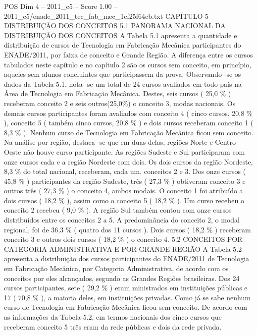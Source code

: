 \begin{textsample}{POS Dim 4 – 2011\_c5 – Score 1.00 – 2011\_c5/enade\_2011\_tec\_fab\_mec\_1cf25f64cb.txt}  \label{ex:f4_pos_240}
CAPÍTULO 5 DISTRIBUIÇÃO DOS CONCEITOS 5.1 PANORAMA NACIONAL DA DISTRIBUIÇÃO DOS CONCEITOS A Tabela 5.1 apresenta a quantidade e distribuição de cursos de Tecnologia em Fabricação Mecânica participantes do ENADE/2011, por faixa de conceito e Grande Região.
A diferença entre os cursos tabulados neste capítulo e no capítulo 2 são os cursos sem conceito, em princípio, aqueles sem alunos concluintes que participassem da prova.
Observando -se os dados da Tabela 5.1, nota -se um total de 24 cursos avaliados em todo país na Área de Tecnologia em Fabricação Mecânica.
Destes, seis cursos ( 25,0 \% ) receberam conceito 2 e seis outros(25,0\%) o conceito 3, modas nacionais.
Os demais cursos participantes foram avaliados com conceito 4 ( cinco cursos, 20,8 \% ), conceito 5 ( também cinco cursos, 20,8 \% ) e dois cursos receberam conceito 1 ( 8,3 \% ).
Nenhum curso de Tecnologia em Fabricação Mecânica ficou sem conceito.
Na análise por região, destaca -se que em duas delas, regiões Norte e Centro-Oeste não houve curso participante.
As regiões Sudeste e Sul participaram com onze cursos cada e a região Nordeste com dois.
Os dois cursos da região Nordeste, 8,3 \% do total nacional, receberam, cada um, conceitos 2 e 3.
Dos onze cursos ( 45,8 \% ) participantes da região Sudeste, três ( 27,3 \% ) obtiveram conceito 3 e outros três ( 27,3 \% ) o conceito 4, ambos modais.
O conceito 1 foi atribuído a dois cursos ( 18,2 \% ), assim como o conceito 5 ( 18,2 \% ).
Um curso recebeu o conceito 2 recebeu ( 9,0 \% ).
A região Sul também contou com onze cursos distribuídos entre os conceitos 2 a 5.
A predominância do conceito 2, o modal regional, foi de 36,3 \% ( quatro dos 11 cursos ).
Dois cursos ( 18,2 \% ) receberam conceito 3 e outros dois cursos ( 18,2 \% ) o conceito 4. 5.2 CONCEITOS POR CATEGORIA ADMINISTRATIVA E POR GRANDE REGIÃO A Tabela 5.2 apresenta a distribuição dos cursos participantes do ENADE/2011 de Tecnologia em Fabricação Mecânica, por Categoria Administrativa, de acordo com os conceitos por eles alcançados, segundo as Grandes Regiões brasileiras.
Dos 24 cursos participantes, sete ( 29,2 \% ) eram ministrados em instituições públicas e 17 ( 70,8 \% ), a maioria deles, em instituições privadas.
Como já se sabe nenhum curso de Tecnologia em Fabricação Mecânica ficou sem conceito.
De acordo com as informações da Tabela 5.2, em termos nacionais dos cinco cursos que receberam conceito 5 três eram da rede públicas e dois da rede privada.

\end{textsample}

